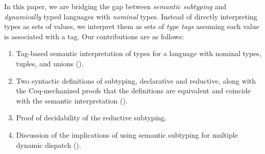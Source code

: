 In this paper, we are bridging the gap between \emph{semantic subtyping} and 
\emph{dynamically} typed languages with \emph{nominal} types.
Instead of directly interpreting types as sets of values,
we interpret them as sets of \emph{type tags} assuming 
each value is associated with a tag.
Our contributions are as follows:
\begin{enumerate}
  \item Tag-based semantic interpretation of types for a language
    with nominal types, tuples, and unions ().
  \item Two syntactic definitions of subtyping, declarative and reductive,
    along with the Coq-mechanized proofs that the definitions are equivalent
    and coincide with the semantic interpretation (). 	
  \item Proof of decidability of the reductive subtyping.
  \item Discussion of the implications of using semantic subtyping
    for multiple dynamic dispatch ().
\end{enumerate}






